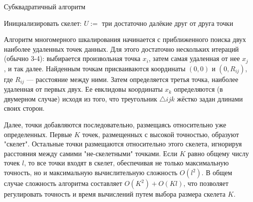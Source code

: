 \begin{algorithm}[H]
    \caption{Субквадратичный алгоритм}
    
    Инициализировать скелет: $U :=$ три достаточно далёкие друг от друга точки
    
    
    
\end{algorithm}

Алгоритм многомерного шкалирования начинается с приближенного поиска двух наиболее удаленных точек данных. Для этого достаточно нескольких итераций (обычно 3-4): выбирается произвольная точка $x_i$, затем самая удаленная от нее $x_j$, и так далее. Найденным точкам присваиваются координаты $(0, 0)$ и $(0, R_{ij} )$, где $R_{ij}$ — расстояние между ними. Затем определяется третья точка, наиболее удаленная от первых двух. Ее евклидовы координаты $x_k$ определяются (в двумерном случае) исходя из того, что треугольник $\triangle ijk$
жёстко задан длинами своих сторон.

Далее, точки добавляются последовательно, размещаясь относительно уже определенных. Первые $K$ точек, размещенных с высокой точностью, образуют "скелет". Остальные точки размещаются относительно этого скелета, игнорируя расстояния между самими "не-скелетными" точками. Если $K$ равно общему числу точек $l$, то все точки входят в скелет, обеспечивая не только максимальную точность, но и максимальную вычислительную сложность $O(l^2)$. В общем случае сложность алгоритма составляет $O(K^2) + O(Kl)$, что позволяет регулировать точность и время вычислений путем выбора размера скелета $K$.


